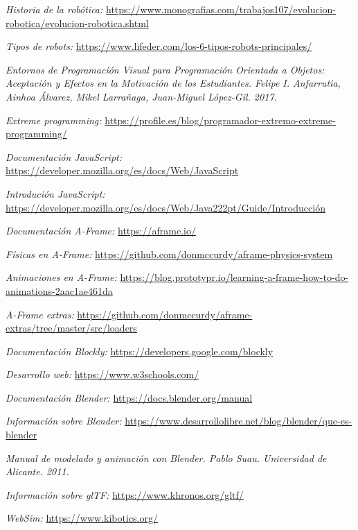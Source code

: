 \begin{thebibliography}{99}

    \textit{Historia de la robótica:}   \url{https://www.monografias.com/trabajos107/evolucion-robotica/evolucion-robotica.shtml}
    
    \textit{Tipos de robots:}   \url{https://www.lifeder.com/los-6-tipos-robots-principales/}
    
    \textit{Entornos de Programación Visual para Programación Orientada a Objetos: Aceptación y Efectos en la Motivación de los Estudiantes. Felipe I. Anfarrutia, Ainhoa Álvarez, Mikel Larrañaga, Juan-Miguel López-Gil. 2017.}
    
    \textit{Extreme programming: }
    \url{https://profile.es/blog/programador-extremo-extreme-programming/}
    
    \textit{Documentación JavaScript: }
    \url{https://developer.mozilla.org/es/docs/Web/JavaScript}
    
    \textit{Introdución JavaScript: }
    \url{https://developer.mozilla.org/es/docs/Web/Java222pt/Guide/Introducción}
   
    \textit{Documentación A-Frame:}
    \url{https://aframe.io/}
    
    \textit{Físicas en A-Frame: }
    \url{https://github.com/donmccurdy/aframe-physics-system}
    
    \textit{Animaciones en A-Frame: }
    \url{https://blog.prototypr.io/learning-a-frame-how-to-do-animations-2aac1ae461da}
    
    \textit{A-Frame extras: }
    \url{https://github.com/donmccurdy/aframe-extras/tree/master/src/loaders}
    
    \textit{Documentación Blockly: }
    \url{https://developers.google.com/blockly}
    
    \textit{Desarrollo web: }
    \url{https://www.w3schools.com/}
    
    \textit{Documentación Blender: }
    \url{https://docs.blender.org/manual}
    
    \textit{Información sobre Blender: }
    \url{https://www.desarrollolibre.net/blog/blender/que-es-blender}
    
    \textit{Manual de modelado y animación con Blender. Pablo Suau. Universidad de Alicante. 2011.}
    
    \textit{Información sobre glTF: }
    \url{https://www.khronos.org/gltf/}
   
    \textit{WebSim:}  
    \url{https://www.kibotics.org/}
\end{thebibliography}
